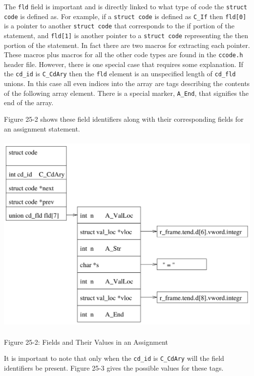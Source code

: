 The \texttt{fld} field is important and is directly linked to what
type of code the \texttt{struct code} is defined as.  For example, if
a \texttt{struct code} is defined as \texttt{C\_If} then
\texttt{fld[0]} is a pointer to another \texttt{struct code} that
corresponds to the if portion of the statement, and \texttt{fld[1]} is
another pointer to a \texttt{struct code} representing the then
portion of the statement. In fact there are two macros for extracting
each pointer. These macros plus macros for all the other code types
are found in the \texttt{ccode.h} header file. However, there is one
special case that requires some explanation. If the \texttt{cd\_id} is
\texttt{C\_CdAry} then the \texttt{fld} element is an unspecified
length of \texttt{cd\_fld} unions. In this case all even indices into
the array are tags describing the contents of the following array
element. There is a special marker, \texttt{A\_End}, that signifies
the end of the array.

Figure 25-2 shows
these field identifiers along with their corresponding fields for an
assignment statement.

\begin{center}
\includegraphics[width=6.0in,height=4.0in]{struct_code_assign_full.png}

Figure 25-2: Fields and Their Values in an Assignment
\end{center}


 It is important to note that only when the
\texttt{cd\_id} is \texttt{C\_CdAry} will the field identifiers be
present. Figure 25-3 gives the possible values for these tags.

